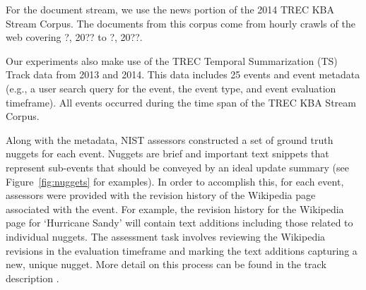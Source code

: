 For the document stream, we use the news portion of the
 2014 TREC KBA Stream Corpus.
The documents from this corpus come from hourly crawls of the web covering 
 ?, 20?? to ?, 20??. 

Our experiments also make use of the TREC Temporal Summarization (TS) Track
 data from 2013 and 2014. 
This data includes 25 events and event metadata (e.g., a user
search query for the event, the event type, and event evaluation timeframe).  
All events occurred during the time span of the TREC KBA Stream Corpus.

Along with the metadata, NIST assessors constructed a set of ground truth nuggets for each event. 
Nuggets are brief and important text snippets that represent sub-events that should be conveyed
by an ideal update summary (see Figure~\ref{fig:nuggets} for examples).
In order
to accomplish this, for each event, assessors were provided with the
revision history of the Wikipedia page associated with the event.  
For example, 
the revision history for the Wikipedia page for `Hurricane Sandy' will 
contain text additions including those related to individual nuggets.  The assessment
task involves reviewing the Wikipedia revisions in the evaluation timeframe 
and marking the text additions capturing a new, unique nugget.  More detail
on this process can be found in the track description \cite{?}.


